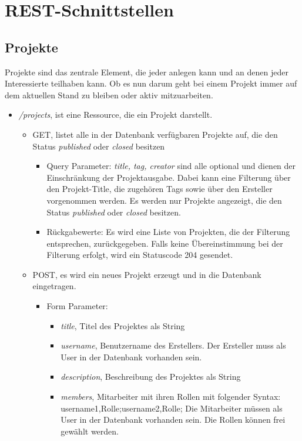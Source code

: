 \documentclass[12pt]{scrartcl}
\begin{document}
	\section{REST-Schnittstellen} \label{sec:restschnittstellen}
\subsection{Projekte}
	Projekte sind das zentrale Element, die jeder anlegen kann und an denen jeder Interessierte teilhaben kann. Ob es nun darum geht bei einem Projekt immer auf dem aktuellen Stand zu bleiben oder aktiv mitzuarbeiten.
	\begin{itemize}
			\item \emph{/projects}, ist eine Ressource, die ein Projekt darstellt. 
			\begin{itemize}
				\item GET, listet alle in der Datenbank verfügbaren Projekte auf, die den Status \emph{published} oder \emph{closed} besitzen
				\begin{itemize}
					\item Query Parameter: \emph{title, tag, creator} sind alle optional und dienen der Einschränkung der Projektausgabe. Dabei kann eine Filterung über den Projekt-Title, die zugehören Tags sowie über den Ersteller vorgenommen werden. Es werden nur Projekte angezeigt, die den Status \emph{published} oder \emph{closed} besitzen.
					\item Rückgabewerte: Es wird eine Liste von Projekten, die der Filterung entsprechen, zurückgegeben. Falls keine Übereinstimmung bei der Filterung erfolgt, wird ein Statuscode 204 gesendet. 
				\end{itemize}
				\item POST, es wird ein neues Projekt erzeugt und in die Datenbank eingetragen.
				\begin{itemize}
					\item Form Parameter:
					\begin{itemize}
						\item  \emph{title}, Titel des Projektes als String
						\item  \emph{username}, Benutzername des Erstellers. Der Ersteller muss als User in der Datenbank vorhanden sein.
						\item  \emph{description}, Beschreibung des Projektes als String
						\item  \emph{members}, Mitarbeiter mit ihren Rollen mit folgender Syntax: username1,Rolle;username2,Rolle; Die Mitarbeiter müssen als User in der Datenbank vorhanden sein. Die Rollen können frei gewählt werden.

\end{itemize}
\end{itemize}
\end{itemize}
\end{itemize}
\end{document}
